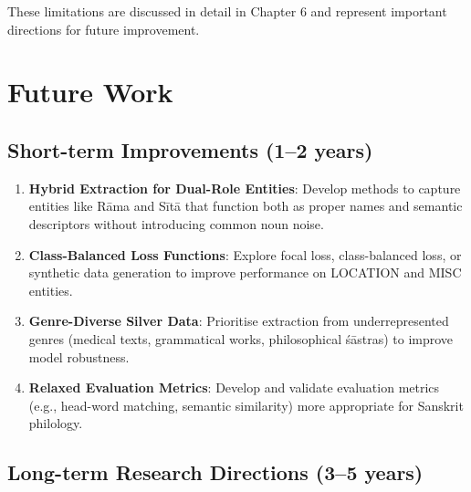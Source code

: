 These limitations are discussed in detail in Chapter 6 and represent important directions for future improvement.

\section{Future Work}

\subsection{Short-term Improvements (1--2 years)}

\begin{enumerate}
    \item \textbf{Hybrid Extraction for Dual-Role Entities}: Develop methods to capture entities like Rāma and Sītā that function both as proper names and semantic descriptors without introducing common noun noise.

    \item \textbf{Class-Balanced Loss Functions}: Explore focal loss, class-balanced loss, or synthetic data generation to improve performance on LOCATION and MISC entities.

    \item \textbf{Genre-Diverse Silver Data}: Prioritise extraction from underrepresented genres (medical texts, grammatical works, philosophical śāstras) to improve model robustness.

    \item \textbf{Relaxed Evaluation Metrics}: Develop and validate evaluation metrics (e.g., head-word matching, semantic similarity) more appropriate for Sanskrit philology.
\end{enumerate}

\subsection{Long-term Research Directions (3--5 years)}

